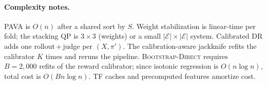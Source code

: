 \vspace{-2pt}
\paragraph{Complexity notes.}
PAVA is $O(n)$ after a shared sort by $S$. Weight stabilization is linear-time per fold; the stacking QP is $3{\times}3$ (weights) or a small $|\mathcal E|{\times}|\mathcal E|$ system. Calibrated DR adds one rollout\,+\,judge per $(X,\pi')$. The calibration-aware jackknife refits the calibrator $K$ times and reruns the pipeline. \textsc{Bootstrap-Direct} requires $B{=}2{,}000$ refits of the reward calibrator; since isotonic regression is $O(n\log n)$, total cost is $O(Bn\log n)$. TF caches and precomputed features amortize cost.
